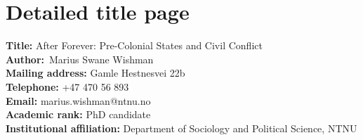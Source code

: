 \documentclass[12pt]{article}
\title{}
\author{}
\date{}
\begin{document}
\section*{Detailed title page}
\textbf{Title:} After Forever: Pre-Colonial States and Civil Conflict\\
\textbf{Author:} Marius Swane Wishman \\
\textbf{Mailing address:} Gamle Hestnesvei 22b \\
\textbf{Telephone:} +47 470 56 893\\
\textbf{Email:} marius.wishman@ntnu.no\\
\textbf{Academic rank:} PhD candidate\\
\textbf{Institutional affiliation:} Department of Sociology and Political
Science, NTNU\\
\end{document}
